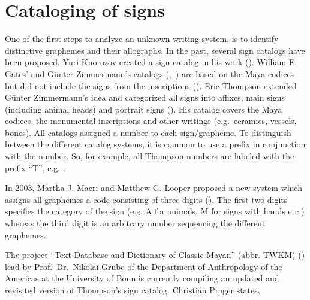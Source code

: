 \documentclass[../main.tex]{subfiles}
\begin{document}
\section{Cataloging of signs}
One of the first steps to analyze an unknown writing system, is to identify distinctive graphemes 
and their allographs. 
In the past, several sign catalogs have been proposed.
Yuri Knorozov created a sign catalog in his work (\cite[109\psq]{knorozov1967}).
William E. Gates' and G\"unter Zimmermann's catalogs (\cite{gates1931},~\cite{zimmermann1956}) are 
based on the Maya codices but did not include the signs from the inscriptions 
(\cite[4]{thompson1962catalog}). 
Eric Thompson extended G\"unter Zimmermann's idea and categorized all signs into affixes, main signs 
(including animal heads) and portrait signs (\cite[4]{thompson1962catalog}).
His catalog covers the Maya codices, the monumental inscriptions and other writings 
(e.g.\ ceramics, vessels, bones).
All catalogs assigned a number to each sign/grapheme.
To distinguish between the different catalog systems, it is common to use a prefix in 
conjunction with the number.
So, for example, all Thompson numbers are labeled with the prefix ``T'', e.g. .

In 2003, Martha J. Macri and Matthew G. Looper proposed a new system which assigns all graphemes
a code consisting of three digits (\cite[21,25]{macrilooper2003}).
The first two digits specifies the category of the sign 
(e.g. A for animals, M for signs with hands etc.) whereas the third digit is an arbitrary number
sequencing the different graphemes.

The project ``Text Database and Dictionary of Classic Mayan'' (abbr. TWKM) (\cite{twkm2014}) lead by 
Prof.\ Dr.\ Nikolai Grube of the Department of Anthropology of the Americas at the University of 
Bonn is currently compiling an updated and revisited version of Thompson's sign catalog.
Christian Prager states, 
\end{document}

